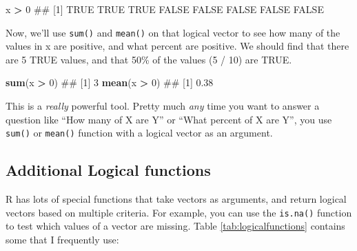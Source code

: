 \documentclass[]{book}
\newenvironment{Shaded}{\begin{snugshade}}{\end{snugshade}}
\newcommand{\KeywordTok}[1]{\textcolor[rgb]{0.13,0.29,0.53}{\textbf{#1}}}
\newcommand{\DecValTok}[1]{\textcolor[rgb]{0.00,0.00,0.81}{#1}}
\newcommand{\StringTok}[1]{\textcolor[rgb]{0.31,0.60,0.02}{#1}}
\newcommand{\OperatorTok}[1]{\textcolor[rgb]{0.81,0.36,0.00}{\textbf{#1}}}
\newcommand{\NormalTok}[1]{#1}
\theoremstyle{definition}
\theoremstyle{definition}
\theoremstyle{remark}
\begin{document}
\begin{Shaded}
\begin{Highlighting}[]
\NormalTok{x }\OperatorTok{>}\StringTok{ }\DecValTok{0}
\NormalTok{## [1]  TRUE  TRUE  TRUE FALSE FALSE FALSE FALSE FALSE}
\end{Highlighting}
\end{Shaded}

Now, we'll use \texttt{sum()} and \texttt{mean()} on that logical vector
to see how many of the values in x are positive, and what percent are
positive. We should find that there are 5 TRUE values, and that 50\% of
the values (5 / 10) are TRUE.

\begin{Shaded}
\begin{Highlighting}[]
\KeywordTok{sum}\NormalTok{(x }\OperatorTok{>}\StringTok{ }\DecValTok{0}\NormalTok{)}
\NormalTok{## [1] 3}
\KeywordTok{mean}\NormalTok{(x }\OperatorTok{>}\StringTok{ }\DecValTok{0}\NormalTok{)}
\NormalTok{## [1] 0.38}
\end{Highlighting}
\end{Shaded}

This is a \emph{really} powerful tool. Pretty much \emph{any} time you
want to answer a question like ``How many of X are Y'' or ``What percent
of X are Y'', you use \texttt{sum()} or \texttt{mean()} function with a
logical vector as an argument.

\subsection{Additional Logical
functions}\label{additional-logical-functions}

R has lots of special functions that take vectors as arguments, and
return logical vectors based on multiple criteria. For example, you can
use the \texttt{is.na()} function to test which values of a vector are
missing. Table \ref{tab:logicalfunctions} contains some that I
frequently use:
\end{document}
